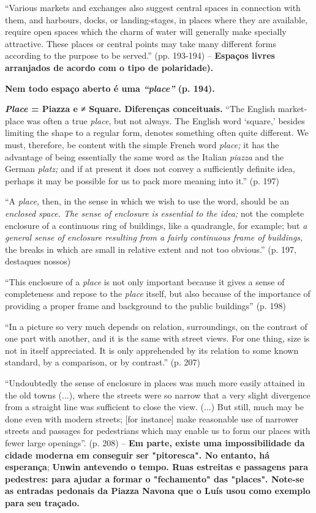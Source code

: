 \documentclass[12pt, a4paper]{book} %
\begin{document}
        ``Various markets and exchanges also suggest central spaces in connection with them, and harbours, docks, or landing-stages, in places where they are available, require open spaces which the charm of water will generally make specially attractive. These places or central points may take many different forms according to the purpose to be served.'' (pp. 193-194) – \textbf{Espaços livres arranjados de acordo com o tipo de polaridade).}

        \textbf{Nem todo espaço aberto é uma \textit{``place''} (p. 194).}

        \textbf{\textit{Place} = Piazza e ≠ Square. Diferenças conceituais.} 
        ``The English market-place was often a true \textit{place}, but not always. The English word `square,' besides limiting the shape to a regular form, denotes something often quite different. We must, therefore, be content with the simple French word \textit{place;} it has the advantage of being essentially the same word as the Italian \textit{piazza} and the German \textit{platz;} and if at present it does not convey a sufficiently definite idea, perhaps it may be possible for us to pack more meaning into it.'' (p. 197)

        ``A \textit{place,} then, in the sense in which we wish to use the word, should be an \textit{enclosed space. The sense of enclosure is essential to the idea;} not the complete enclosure of a continuous ring of buildings, like a quadrangle, for example; but \textit{a general sense of enclosure resulting from a fairly continuous frame of buildings,} the breaks in which are small in relative extent and not too obvious.'' (p. 197, destaques nossos)

        ``This enclosure of a \textit{place} is not only important because it gives a sense of completeness and repose to the \textit{place} itself, but also because of the importance of providing a proper frame and background to the public buildings'' (p. 198)

        ``In a picture so very much depends on relation, surroundings, on the contrast of one part with another, and it is the same with street views. For one thing, size is not in itself appreciated. It is only apprehended by its relation to some known standard, by a comparison, or by contrast.'' (p. 207)

        ``Undoubtedly the sense of enclosure in places was much more easily attained in the old towns (...), where the streets were so narrow that a very slight divergence from a straight line was sufficient to close the view. (...) But still, much may be done even with modern streets; [for instance] make reasonable use of narrower streets and passages for pedestrians which may enable us to form our places with fewer large openings''. (p. 208) – \textbf{Em parte, existe uma impossibilidade da cidade moderna em conseguir ser "pitoresca". No entanto, há esperança}; \textbf{Unwin antevendo o tempo. Ruas estreitas e passagens para pedestres: para ajudar a formar o "fechamento" das "places". Note-se as entradas pedonais da Piazza Navona que o Luís usou como exemplo para seu traçado.}
\end{document}
